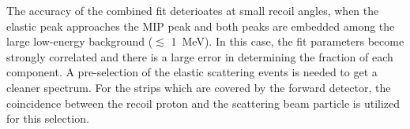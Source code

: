 \documentclass[number,5p]{elsarticle}
\begin{document}
The accuracy of the combined fit deterioates at small recoil angles, when the elastic peak approaches the MIP peak and both peaks are embedded among the large
low-energy background ($\lesssim$ \SI{1}{\MeV}).
In this case, the fit parameters become strongly correlated and there is a large error in determining the fraction of each component.
A pre-selection of the elastic scattering events is needed to get a cleaner spectrum.
For the strips which are covered by the forward detector, the coincidence between the recoil proton and the scattering beam particle is utilized for this selection.

\end{document}
